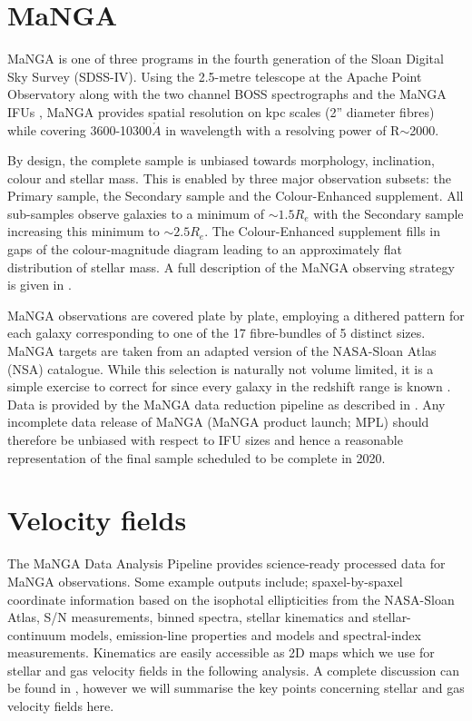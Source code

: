 \section{MaNGA}
MaNGA is one of three programs in the fourth generation of the Sloan Digital Sky Survey (SDSS-IV). Using the 2.5-metre telescope at the Apache Point Observatory \citep{gunn2006} along with the two channel BOSS spectrographs \citep{smee2013} and the MaNGA IFUs \citep{drory2015}, MaNGA provides spatial resolution on kpc scales (2'' diameter fibres) while covering 3600-10300$\mathring{A}$ in wavelength with a resolving power of R$\sim$2000. 

By design, the complete sample is unbiased towards morphology, inclination, colour and stellar mass. This is enabled by three major observation subsets: the Primary sample, the Secondary sample and the Colour-Enhanced supplement. All sub-samples observe galaxies to a minimum of $\sim 1.5 R_{e}$ with the Secondary sample increasing this minimum to $\sim 2.5 R_{e}$. The Colour-Enhanced supplement fills in gaps of the colour-magnitude diagram leading to an approximately flat distribution of stellar mass. A full description of the MaNGA observing strategy is given in \citet{law2015obs,yan2016obs}.

MaNGA observations are covered plate by plate, employing a dithered pattern for each galaxy corresponding to one of the 17 fibre-bundles of 5 distinct sizes. MaNGA targets are taken from an adapted version of the NASA-Sloan Atlas (NSA) catalogue. While this selection is naturally not volume limited, it is a simple exercise to correct for since every galaxy in the redshift range is known \citep{wake2017}. Data is provided by the MaNGA data reduction pipeline as described in \citet{law2016drp,yan2016spec}. Any incomplete data release of MaNGA (MaNGA product launch; MPL) should therefore be unbiased with respect to IFU sizes and hence a reasonable representation of the final sample scheduled to be complete in 2020. 

\section{Velocity fields}
The MaNGA Data Analysis Pipeline \citep[DAP][]{westfall2019,belfiore2019} provides science-ready processed data for MaNGA observations. Some example outputs include; spaxel-by-spaxel coordinate information based on the isophotal ellipticities from the NASA-Sloan Atlas, S/N measurements, binned spectra, stellar kinematics and stellar-continuum models, emission-line properties and models and spectral-index measurements. Kinematics are easily accessible as 2D maps which we use for stellar and gas velocity fields in the following analysis. A complete discussion can be found in \citet{westfall2019,belfiore2019}, however we will summarise the key points concerning stellar and gas velocity fields here.

